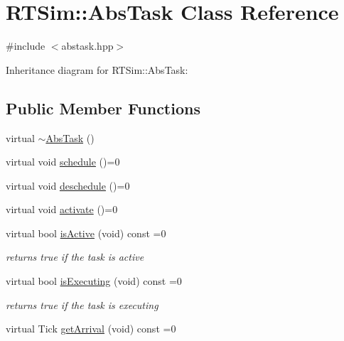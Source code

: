 \hypertarget{classRTSim_1_1AbsTask}{}\section{R\+T\+Sim\+:\+:Abs\+Task Class Reference}
\label{classRTSim_1_1AbsTask}


{\ttfamily \#include $<$abstask.\+hpp$>$}



Inheritance diagram for R\+T\+Sim\+:\+:Abs\+Task\+:
\subsection*{Public Member Functions}
\begin{DoxyCompactItemize}
\item 
virtual \hyperlink{classRTSim_1_1AbsTask_aa97b99d378dd2f0eeb59e46950451548}{$\sim$\+Abs\+Task} ()
\item 
virtual void \hyperlink{classRTSim_1_1AbsTask_ab2020522d2d7a046861672af4afc21df}{schedule} ()=0
\item 
virtual void \hyperlink{classRTSim_1_1AbsTask_acbfd410d6c4bd7167aad07d9ca765ff0}{deschedule} ()=0
\item 
virtual void \hyperlink{classRTSim_1_1AbsTask_a87173c992932ab414d9c993c022d6423}{activate} ()=0
\item 
virtual bool \hyperlink{classRTSim_1_1AbsTask_a44e440b2b00cec3c45194de0e554f751}{is\+Active} (void) const =0\hypertarget{classRTSim_1_1AbsTask_a44e440b2b00cec3c45194de0e554f751}{}\label{classRTSim_1_1AbsTask_a44e440b2b00cec3c45194de0e554f751}

\begin{DoxyCompactList}\small\item\em returns true if the task is active \end{DoxyCompactList}\item 
virtual bool \hyperlink{classRTSim_1_1AbsTask_a91efc74f184aa7b0331c5bb1c8ebd12c}{is\+Executing} (void) const =0\hypertarget{classRTSim_1_1AbsTask_a91efc74f184aa7b0331c5bb1c8ebd12c}{}\label{classRTSim_1_1AbsTask_a91efc74f184aa7b0331c5bb1c8ebd12c}

\begin{DoxyCompactList}\small\item\em returns true if the task is executing \end{DoxyCompactList}\item 
virtual Tick \hyperlink{classRTSim_1_1AbsTask_acac5cb959420770736d3c0fc51ec31c9}{get\+Arrival} (void) const =0\hypertarget{classRTSim_1_1AbsTask_acac5cb959420770736d3c0fc51ec31c9}{}\label{classRTSim_1_1AbsTask_acac5cb959420770736d3c0fc51ec31c9}


\end{DoxyCompactItemize}

